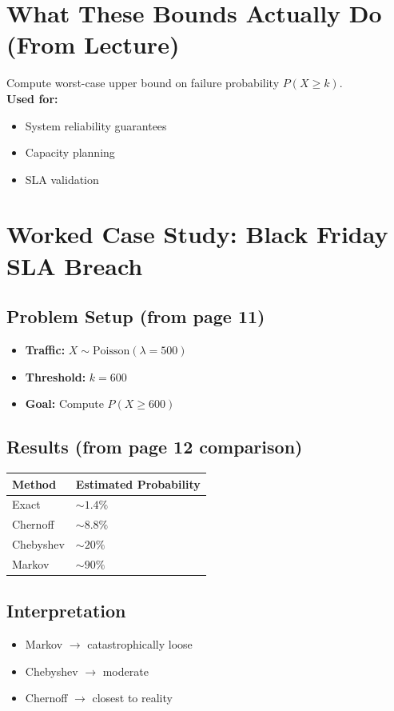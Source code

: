 \documentclass[11pt]{article}
\begin{document}
\section{What These Bounds Actually Do (From Lecture)}
Compute worst-case upper bound on failure probability $P(X \ge k)$. \\
\textbf{Used for:}
\begin{itemize}
    \item System reliability guarantees
    \item Capacity planning
    \item SLA validation
\end{itemize}

\section{Worked Case Study: Black Friday SLA Breach}
\subsection{Problem Setup (from page 11)}
\begin{itemize}
    \item \textbf{Traffic:} $X \sim \text{Poisson}(\lambda = 500)$
    \item \textbf{Threshold:} $k = 600$
    \item \textbf{Goal:} Compute $P(X \ge 600)$
\end{itemize}

\subsection{Results (from page 12 comparison)}
\begin{center}
\renewcommand{\arraystretch}{1.3}
\begin{tabular}{|l|l|}
\hline
\textbf{Method} & \textbf{Estimated Probability} \\
\hline
Exact & $\sim 1.4\%$ \\
Chernoff & $\sim 8.8\%$ \\
Chebyshev & $\sim 20\%$ \\
Markov & $\sim 90\%$ \\
\hline
\end{tabular}
\end{center}

\subsection{Interpretation}
\begin{itemize}
    \item Markov $\rightarrow$ catastrophically loose
    \item Chebyshev $\rightarrow$ moderate
    \item Chernoff $\rightarrow$ closest to reality
\end{itemize}
\end{document}
